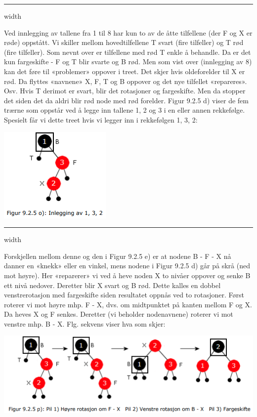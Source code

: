 \documentclass[11pt]{article}
\begin{document}
        \hrule width \textwidth

        \begin{multicols}{2}
            Ved innlegging av tallene fra 1 til 8 har kun to av de åtte tilfellene (der F og X er røde)
            oppstått. Vi skiller mellom hovedtilfellene T svart (fire tilfeller) og T rød (fire tilfeller).
            Som nevnt over er tilfellene med rød T enkle å behandle. Da er det kun fargeskifte - F og T blir
            svarte og B rød. Men som vist over (innlegging av 8) kan det føre til «problemer» oppover i
            treet. Det skjer hvis oldeforelder til X er rød. Da flyttes «navnene» X, F, T og B oppover og
            det nye tilfellet «repareres». Osv.
            Hvis T derimot er svart, blir det rotasjoner og fargeskifte. Men da stopper det siden det da
            aldri blir rød node med rød forelder. Figur 9.2.5 d) viser de fem trærne som oppstår ved å
            legge inn tallene 1, 2 og 3 i en eller annen rekkefølge. Spesielt får vi dette treet hvis vi legger
            inn i rekkefølgen 1, 3, 2:


            \columnbreak
            \includegraphics[center]{f-9.2.5o.png}

        \end{multicols}

        \hrule width \textwidth

        Forskjellen mellom denne og den i Figur 9.2.5 e) er at nodene B - F - X nå danner en «knekk»
        eller en vinkel, mens nodene i Figur 9.2.5 d) går på skrå (ned mot høyre). Her «reparerer» vi
        ved å heve noden X to nivåer oppover og senke B ett nivå nedover. Deretter blir X svart og B
        rød. Dette kalles en dobbel venstrerotasjon med fargeskifte siden resultatet oppnås ved to
        rotasjoner. Først roterer vi mot høyre mhp. F - X, dvs. om midtpunktet på kanten mellom F
        og X. Da heves X og F senkes. Deretter (vi beholder nodenavnene) roterer vi mot venstre
        mhp. B - X. Flg. sekvens viser hva som skjer:


        \includegraphics[center]{f-9.2.5p.png}
\end{document}
